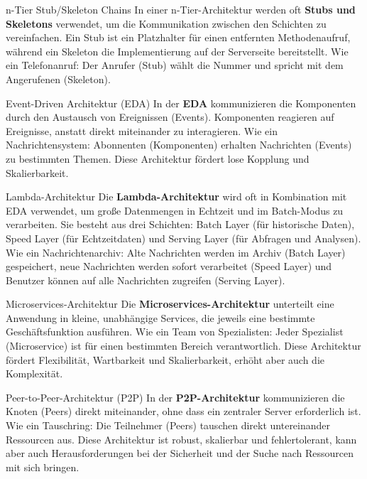 \documentclass{beamer}
\begin{document}
\begin{frame}{n-Tier Stub/Skeleton Chains}
    In einer n-Tier-Architektur werden oft \textbf{Stubs und Skeletons} verwendet, um die Kommunikation zwischen den Schichten zu vereinfachen. Ein Stub ist ein Platzhalter für einen entfernten Methodenaufruf, während ein Skeleton die Implementierung auf der Serverseite bereitstellt.  Wie ein Telefonanruf:  Der Anrufer (Stub) wählt die Nummer und spricht mit dem Angerufenen (Skeleton).
\end{frame}


\begin{frame}{Event-Driven Architektur (EDA)}
    In der \textbf{EDA} kommunizieren die Komponenten durch den Austausch von Ereignissen (Events). Komponenten reagieren auf Ereignisse, anstatt direkt miteinander zu interagieren.  Wie ein Nachrichtensystem:  Abonnenten (Komponenten) erhalten Nachrichten (Events) zu bestimmten Themen.  Diese Architektur fördert lose Kopplung und Skalierbarkeit.
\end{frame}

\begin{frame}{Lambda-Architektur}
    Die \textbf{Lambda-Architektur} wird oft in Kombination mit EDA verwendet, um große Datenmengen in Echtzeit und im Batch-Modus zu verarbeiten.  Sie besteht aus drei Schichten: Batch Layer (für historische Daten), Speed Layer (für Echtzeitdaten) und Serving Layer (für Abfragen und Analysen).  Wie ein Nachrichtenarchiv:  Alte Nachrichten werden im Archiv (Batch Layer) gespeichert, neue Nachrichten werden sofort verarbeitet (Speed Layer) und Benutzer können auf alle Nachrichten zugreifen (Serving Layer).
\end{frame}


\begin{frame}{Microservices-Architektur}
    Die \textbf{Microservices-Architektur} unterteilt eine Anwendung in kleine, unabhängige Services, die jeweils eine bestimmte Geschäftsfunktion ausführen.  Wie ein Team von Spezialisten:  Jeder Spezialist (Microservice) ist für einen bestimmten Bereich verantwortlich.  Diese Architektur fördert Flexibilität, Wartbarkeit und Skalierbarkeit, erhöht aber auch die Komplexität.
\end{frame}


\begin{frame}{Peer-to-Peer-Architektur (P2P)}
    In der \textbf{P2P-Architektur} kommunizieren die Knoten (Peers) direkt miteinander, ohne dass ein zentraler Server erforderlich ist.  Wie ein Tauschring:  Die Teilnehmer (Peers) tauschen direkt untereinander Ressourcen aus. Diese Architektur ist robust, skalierbar und fehlertolerant, kann aber auch Herausforderungen bei der Sicherheit und der Suche nach Ressourcen mit sich bringen.
\end{frame}
\end{document}
